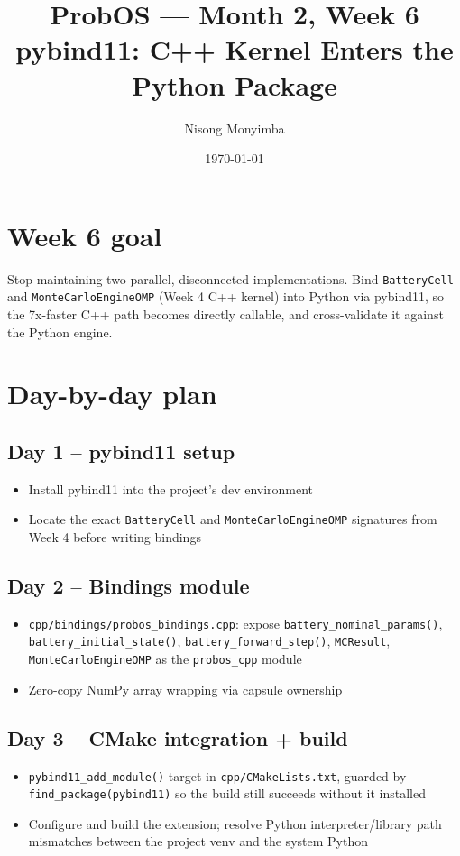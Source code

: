 \documentclass[11pt]{article}
\title{ProbOS --- Month 2, Week 6\\pybind11: C++ Kernel Enters the Python Package}
\author{Nisong Monyimba}
\date{\today}
\begin{document}
\maketitle

\section*{Week 6 goal}
Stop maintaining two parallel, disconnected implementations. Bind
\texttt{BatteryCell} and \texttt{MonteCarloEngineOMP} (Week 4 C++
kernel) into Python via pybind11, so the 7x-faster C++ path becomes
directly callable, and cross-validate it against the Python engine.

\section*{Day-by-day plan}

\subsection*{Day 1 -- pybind11 setup}
\begin{itemize}[leftmargin=*]
  \item Install pybind11 into the project's dev environment
  \item Locate the exact \texttt{BatteryCell} and
    \texttt{MonteCarloEngineOMP} signatures from Week 4 before writing
    bindings
\end{itemize}

\subsection*{Day 2 -- Bindings module}
\begin{itemize}[leftmargin=*]
  \item \texttt{cpp/bindings/probos\_bindings.cpp}: expose
    \texttt{battery\_nominal\_params()},
    \texttt{battery\_initial\_state()}, \texttt{battery\_forward\_step()},
    \texttt{MCResult}, \texttt{MonteCarloEngineOMP} as the
    \texttt{probos\_cpp} module
  \item Zero-copy NumPy array wrapping via capsule ownership
\end{itemize}

\subsection*{Day 3 -- CMake integration + build}
\begin{itemize}[leftmargin=*]
  \item \texttt{pybind11\_add\_module()} target in
    \texttt{cpp/CMakeLists.txt}, guarded by
    \texttt{find\_package(pybind11)} so the build still succeeds
    without it installed
  \item Configure and build the extension; resolve Python
    interpreter/library path mismatches between the project venv and
    the system Python
\end{itemize}
\end{document}
